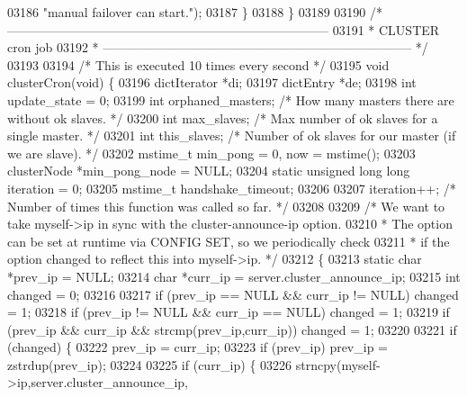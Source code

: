 \begin{DoxyCode}
{{{{{{{{{{{{{{{{{{{{{{{{{{{{{{{{{{{{{{{{{{{{{{{{{{{{{{{{{03186             \textcolor{stringliteral}{"manual failover can start."});
03187     \}
03188 \}
03189 
03190 \textcolor{comment}{/* -----------------------------------------------------------------------------}
03191 \textcolor{comment}{ * CLUSTER cron job}
03192 \textcolor{comment}{ * -------------------------------------------------------------------------- */}
03193 
03194 \textcolor{comment}{/* This is executed 10 times every second */}
03195 \textcolor{keywordtype}{void} clusterCron(\textcolor{keywordtype}{void}) \{
03196     dictIterator *di;
03197     dictEntry *de;
03198     \textcolor{keywordtype}{int} update\_state = 0;
03199     \textcolor{keywordtype}{int} orphaned\_masters; \textcolor{comment}{/* How many masters there are without ok slaves. */}
03200     \textcolor{keywordtype}{int} max\_slaves; \textcolor{comment}{/* Max number of ok slaves for a single master. */}
03201     \textcolor{keywordtype}{int} this\_slaves; \textcolor{comment}{/* Number of ok slaves for our master (if we are slave). */}
03202     mstime\_t min\_pong = 0, now = mstime();
03203     clusterNode *min\_pong\_node = NULL;
03204     \textcolor{keyword}{static} \textcolor{keywordtype}{unsigned} \textcolor{keywordtype}{long} \textcolor{keywordtype}{long} iteration = 0;
03205     mstime\_t handshake\_timeout;
03206 
03207     iteration++; \textcolor{comment}{/* Number of times this function was called so far. */}
03208 
03209     \textcolor{comment}{/* We want to take myself->ip in sync with the cluster-announce-ip option.}
03210 \textcolor{comment}{     * The option can be set at runtime via CONFIG SET, so we periodically check}
03211 \textcolor{comment}{     * if the option changed to reflect this into myself->ip. */}
03212     \{
03213         \textcolor{keyword}{static} \textcolor{keywordtype}{char} *prev\_ip = NULL;
03214         \textcolor{keywordtype}{char} *curr\_ip = server.cluster\_announce\_ip;
03215         \textcolor{keywordtype}{int} changed = 0;
03216 
03217         \textcolor{keywordflow}{if} (prev\_ip == NULL && curr\_ip != NULL) changed = 1;
03218         \textcolor{keywordflow}{if} (prev\_ip != NULL && curr\_ip == NULL) changed = 1;
03219         \textcolor{keywordflow}{if} (prev\_ip && curr\_ip && strcmp(prev\_ip,curr\_ip)) changed = 1;
03220 
03221         \textcolor{keywordflow}{if} (changed) \{
03222             prev\_ip = curr\_ip;
03223             \textcolor{keywordflow}{if} (prev\_ip) prev\_ip = zstrdup(prev\_ip);
03224 
03225             \textcolor{keywordflow}{if} (curr\_ip) \{
03226                 strncpy(myself->ip,server.cluster\_announce\_ip,
}}}}}}}}}}}}}}}}}}}}}}}}}}}}}}}}}}}}}}}}}}}}}}}}}}}}}}}}}
\end{DoxyCode}

